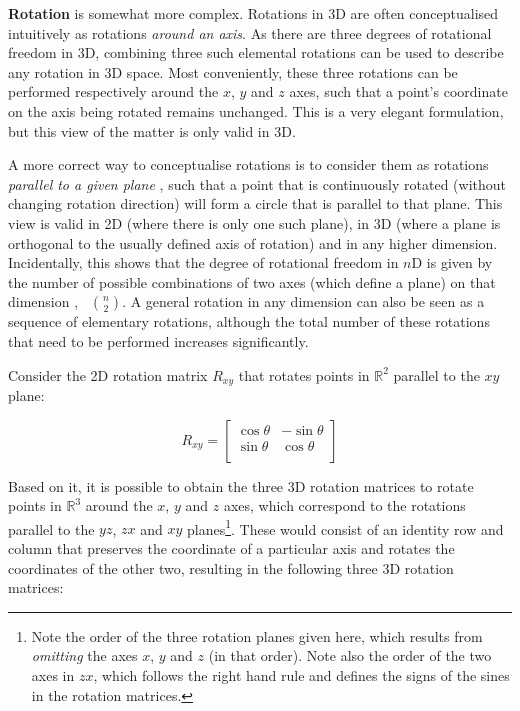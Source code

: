 \textbf{Rotation} is somewhat more complex.
Rotations in 3D are often conceptualised intuitively as rotations \emph{around an axis}.
As there are three degrees of rotational freedom in 3D, combining three such elemental rotations can be used to describe any rotation in 3D space.
Most conveniently, these three rotations can be performed respectively around the $x$, $y$ and $z$ axes, such that a point's coordinate on the axis being rotated remains unchanged.
This is a very elegant formulation, but this view of the matter is only valid in 3D.

A more correct way to conceptualise rotations is to consider them as rotations \emph{parallel to a given plane} \citep{Hollasch91}, such that a point that is continuously rotated (without changing rotation direction) will form a circle that is parallel to that plane.
This view is valid in 2D (where there is only one such plane), in 3D (where a plane is orthogonal to the usually defined axis of rotation) and in any higher dimension.
Incidentally, this shows that the degree of rotational freedom in $n$D is given by the number of possible combinations of two axes (which define a plane) on that dimension \citep{Hanson94}, \ie\ $\binom{n}{2}$.
A general rotation in any dimension can also be seen as a sequence of elementary rotations, although the total number of these rotations that need to be performed increases significantly.

Consider the 2D rotation matrix $R_{xy}$ that rotates points in $\mathbb{R}^2$ parallel to the $xy$ plane:

\begin{equation*}
R_{xy} = \begin{bmatrix}
\cos \theta & -\sin \theta \\
\sin \theta & \cos \theta \\
\end{bmatrix}
\end{equation*}

Based on it, it is possible to obtain the three 3D rotation matrices to rotate points in $\mathbb{R}^3$ around the $x$, $y$ and $z$ axes, which correspond to the rotations parallel to the $yz$, $zx$ and $xy$ planes\footnote{Note the order of the three rotation planes given here, which results from \emph{omitting} the axes $x$, $y$ and $z$ (in that order).
Note also the order of the two axes in $zx$, which follows the right hand rule and defines the signs of the sines in the rotation matrices.}.
These would consist of an identity row and column that preserves the coordinate of a particular axis and rotates the coordinates of the other two, resulting in the following three 3D rotation matrices:

